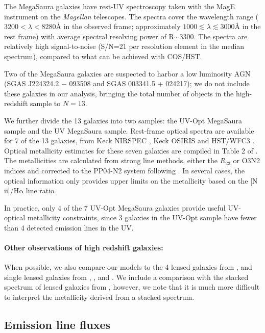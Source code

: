 \documentclass[preprint2]{aastex62}
\newcommand{\nii}{[N\,{\sc ii}]\xspace}
\newcommand{\ha}{\ensuremath{\mathrm{H\alpha}}\xspace}
\newcommand{\ang}{\ensuremath{\mbox{\AA}}\xspace}
\newcommand{\mage}{{\sc Meg}a{\sc S}a{\sc ura}\xspace}
\begin{document}
The \mage galaxies have rest-UV spectroscopy taken with the MagE instrument on the \emph{Magellan} telescopes.
The spectra cover the wavelength range ($3200 < \lambda < 8280$\ang in the observed frame; approximately $1000 \lesssim \lambda \lesssim 3000$\ang in the rest frame) with average spectral resolving power of R$\sim3300$. The spectra are relatively high signal-to-noise (S/N=21 per resolution element in the median spectrum), compared to what can be achieved with COS/HST. 

Two of the \mage galaxies are suspected to harbor a low luminosity AGN (SGAS J224324.2 − 093508 and SGAS 003341.5 + 024217); we do not include these galaxies in our analysis, bringing the total number of objects in the high-redshift sample to $N=13$.

We further divide the 13 galaxies into two samples: the UV-Opt \mage sample and the UV \mage sample. Rest-frame optical spectra are available for 7 of the 13 galaxies, from Keck NIRSPEC \citep{Rigby+2011}, Keck OSIRIS \citep{Wuyts+2014} and HST/WFC3 \citep{Whitaker+2014}. Optical metallicity estimates for these seven galaxies are compiled in Table 2 of \citet{Rigby+2018b}. The metallicities are calculated from strong line methods, either the $R_{23}$ or O3N2 indices \citep{Pettini+2004} and corrected to the PP04-N2 system following \citet{Kewley+2008}. In several cases, the optical information only provides upper limits on the metallicity based on the \nii/\ha line ratio.

In practice, only 4 of the 7 UV-Opt \mage galaxies provide useful UV-optical metallicity constraints, since 3 galaxies in the UV-Opt sample have fewer than 4 detected emission lines in the UV.

\paragraph{Other observations of high redshift galaxies:} When possible, we also compare our models to the 4 lensed galaxies from \citet{Stark+2014}, and single lensed galaxies from \citet{Erb+2010}, \citet{Christensen+2012}, and \citet{Berg+2018}. We include a comparison with the stacked spectrum of lensed galaxies from \citet{Steidel+2016}, however, we note that it is much more difficult to interpret the metallicity derived from a stacked spectrum.

\subsection{Emission line fluxes}
\end{document}

